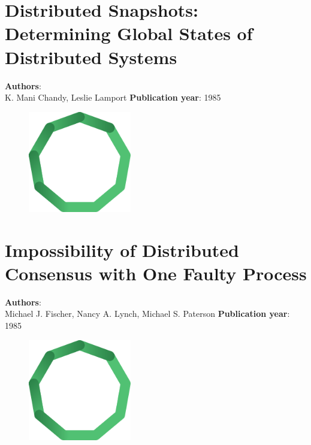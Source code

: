 \documentclass[11pt,fleqn]{book} %
\begin{document}
\chapter{Distributed Snapshots: Determining Global States of Distributed Systems}
\vspace*{-7mm}
\Large \textbf{Authors}: \\
K. Mani Chandy, Leslie Lamport
\newline\newline
\textbf{Publication year}: 1985
\begin{figure}[b]
    \centering
    \includegraphics[width=0.4\textwidth]{distributed-systems.pdf}
\end{figure}


\chapter{Impossibility of Distributed Consensus with One Faulty Process}
\vspace*{-7mm}
\Large \textbf{Authors}: \\
Michael J. Fischer, Nancy A. Lynch, Michael S. Paterson
\newline\newline
\textbf{Publication year}: 1985
\begin{figure}[b]
    \centering
    \includegraphics[width=0.4\textwidth]{distributed-systems.pdf}
\end{figure}

\end{document}
